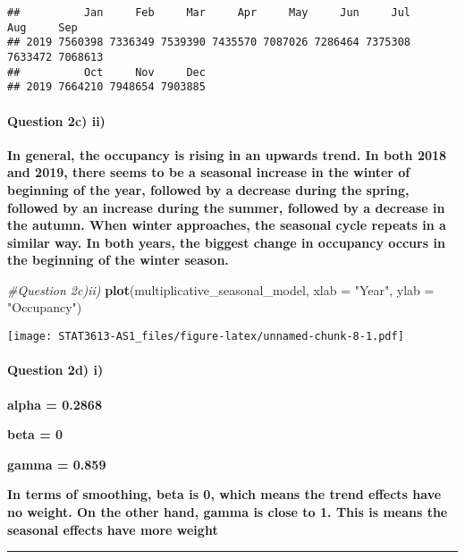 \documentclass[]{article}
\newenvironment{Shaded}{\begin{snugshade}}{\end{snugshade}}
\newcommand{\CommentTok}[1]{\textcolor[rgb]{0.56,0.35,0.01}{\textit{#1}}}
\newcommand{\DataTypeTok}[1]{\textcolor[rgb]{0.13,0.29,0.53}{#1}}
\newcommand{\KeywordTok}[1]{\textcolor[rgb]{0.13,0.29,0.53}{\textbf{#1}}}
\newcommand{\NormalTok}[1]{#1}
\newcommand{\StringTok}[1]{\textcolor[rgb]{0.31,0.60,0.02}{#1}}
\let\oldparagraph\paragraph
\renewcommand{\paragraph}[1]{\oldparagraph{#1}\mbox{}}
\begin{document}
\begin{verbatim}
##          Jan     Feb     Mar     Apr     May     Jun     Jul     Aug     Sep
## 2019 7560398 7336349 7539390 7435570 7087026 7286464 7375308 7633472 7068613
##          Oct     Nov     Dec
## 2019 7664210 7948654 7903885
\end{verbatim}

\hypertarget{question-2c-ii}{%
\paragraph{Question 2c) ii)}\label{question-2c-ii}}

\textbf{In general, the occupancy is rising in an upwards trend. In both
2018 and 2019, there seems to be a seasonal increase in the winter of
beginning of the year, followed by a decrease during the spring,
followed by an increase during the summer, followed by a decrease in the
autumn. When winter approaches, the seasonal cycle repeats in a similar
way. In both years, the biggest change in occupancy occurs in the
beginning of the winter season.}

\begin{Shaded}
\begin{Highlighting}[]
\CommentTok{#Question 2c)ii)}
\KeywordTok{plot}\NormalTok{(multiplicative_seasonal_model, }\DataTypeTok{xlab =} \StringTok{"Year"}\NormalTok{, }\DataTypeTok{ylab =} \StringTok{"Occupancy"}\NormalTok{)}
\end{Highlighting}
\end{Shaded}

\texttt{[image: STAT3613-AS1\_files/figure-latex/unnamed-chunk-8-1.pdf]}

\hypertarget{question-2d-i}{%
\paragraph{Question 2d) i)}\label{question-2d-i}}

\textbf{alpha = 0.2868}

\textbf{beta = 0}

\textbf{gamma = 0.859}

\textbf{In terms of smoothing, beta is 0, which means the trend effects
have no weight. On the other hand, gamma is close to 1. This is means
the seasonal effects have more weight}

\begin{center}\rule{0.5\linewidth}{0.5pt}\end{center}
\end{document}
